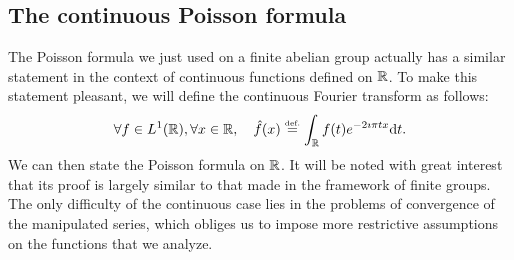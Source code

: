 \subsection{The continuous Poisson formula}
 
 
 The Poisson formula we just used on a finite abelian group actually has a similar statement in the context of continuous functions defined on $ \mathbb{R} $. To make this statement pleasant, we will define the continuous Fourier transform as follows:
\begin{equation}
\label{eq-defn-trans-fourier-special-fish}
\forall f \in L^1 (\mathbb{R}), \forall x \in \mathbb{R}, \quad \hat{f} (x) \stackrel{\mbox{\upshape\tiny def.}}{=} \int_{\mathbb{R}}{f(t) e^{- 2 \imath \pi tx} \mathrm{d} t}.
\end{equation}
We can then state the Poisson formula on $ \mathbb{R} $. It will be noted with great interest that its proof is largely similar to that made in the framework of finite groups. The only difficulty of the continuous case lies in the problems of convergence of the manipulated series, which obliges us to impose more restrictive assumptions on the functions that we analyze.
 
